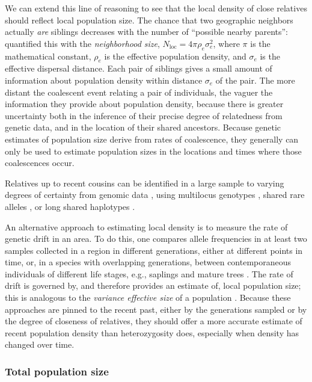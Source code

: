 \documentclass{ar-1col}
\renewcommand{\emph}[1]{{\textit{#1}}}
\begin{document}
We can extend this line of reasoning to see that 
the local density of close relatives
should reflect local population size.
The chance that two geographic neighbors actually \emph{are} siblings 
decreases with the number of ``possible nearby parents'':
\citet{wright1946isolation} quantified this with the
\emph{neighborhood size}, 
$N_\text{loc} = 4 \pi \rho_e \sigma_e^2$,
where $\pi$ is the mathematical constant,
$\rho_e$ is the effective population density,
and $\sigma_e$ is the effective dispersal distance.
Each pair of siblings gives a small amount of information
about population density within distance $\sigma_e$ of the pair.
The more distant the coalescent event relating a pair of individuals, 
the vaguer the information they provide about population density,
because there is greater uncertainty 
both in the inference of their precise degree of relatedness from genetic data,
and in the location of their shared ancestors.
Because genetic estimates of population size 
derive from rates of coalescence,
they generally can only be used to estimate population sizes 
in the locations and times where those coalescences occur.

Relatives up to recent cousins can be identified in a large sample to varying degrees of certainty 
from genomic data \citep[reviewed in][]{wang2016prediction},
using multilocus genotypes \citep{nomura2008estimation,WaplesWaples2011,Wang_2014},
shared rare alleles \citep{NovembreSlatkin2009}, 
or long shared haplotypes \citep[e.g.,][]{li2014relationship}.

An alternative approach to estimating local density
is to measure the rate of genetic drift in an area.
To do this, one compares allele frequencies
in at least two samples collected in a region in different generations, 
either at different points in time,
or, in a species with overlapping generations, 
between contemporaneous individuals of different life stages, 
e.g., saplings and mature trees
\citep{WilliamsonSlatkin1999}.
The rate of drift is governed by, 
and therefore provides an estimate of, 
local population size; 
this is analogous to the \emph{variance effective size} of a population
\citep{ewens2004mpg,Charlesworth2009,wang2016prediction}.
Because these approaches are pinned to the recent past, 
either by the generations sampled or by the degree of closeness of relatives,
they should offer a more accurate estimate of recent population density than heterozygosity does, 
especially when density has changed over time.

\subsubsection{Total population size}
\end{document}
